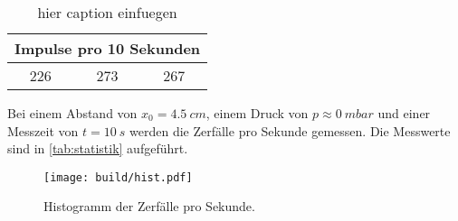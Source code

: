 \begin{table}
  \centering
  \caption{hier caption einfuegen}
  \begin{tabular}{|c|c|c|}
    \toprule
    \multicolumn{3}{|c|}{Impulse pro 10 Sekunden}\\
    \midrule
    226 & 273 & 267 \\
    \bottomrule
  \end{tabular}
  \label{tab:statistik}
\end{table}

Bei einem Abstand von $x_0 = \SI{4.5}{cm}$, einem Druck von $p \approx \SI{0}{mbar}$ und einer Messzeit von $t = \SI{10}{s}$ werden die Zerfälle pro Sekunde gemessen.
Die Messwerte sind in \autoref{tab:statistik} aufgeführt.
\begin{figure}
  \centering
  \texttt{[image: build/hist.pdf]}
  \caption{Histogramm der Zerfälle pro Sekunde.}
  \label{fig:hist}
\end{figure}


%
%      
